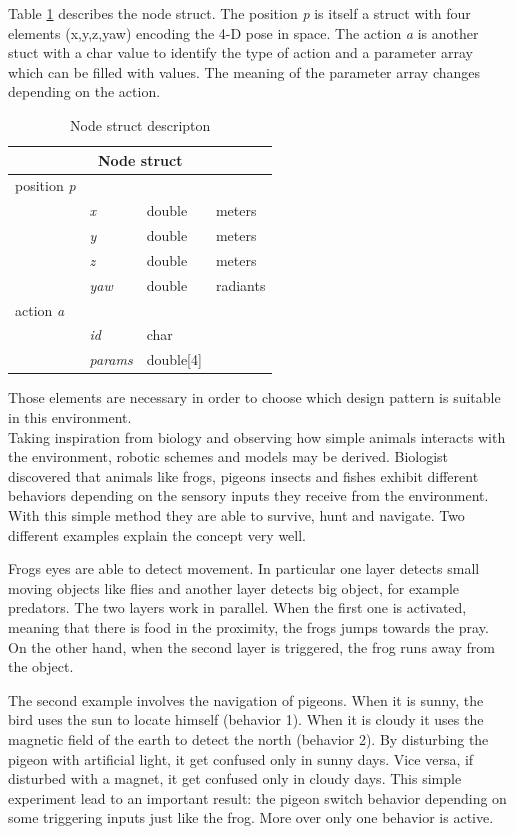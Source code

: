 Table \ref{tab:node} describes the node struct. The position \textit{p} is itself a struct with four elements (x,y,z,yaw) encoding the 4-D pose in space. The action \textit{a} is another stuct with a char value to identify the type of action and a parameter array which can be filled with values. The meaning of the parameter array changes depending on the action.
\begin{table}[h]
\centering
\begin{tabular}{llll}
\multicolumn{4}{c}{\textbf{Node} struct} \\
\hline
position \textit{p} &     &       &           \\
           & \textit{x}   & double & meters    \\
           & \textit{y}   & double & meters    \\
           & \textit{z}   & double & meters    \\
           & \textit{yaw} & double & radiants  \\ \hline
action \textit{a}   &     &       &           \\
           & \textit{id}  & char  &           \\
           & \textit{params}    &  double[4]     & \\
\end{tabular}
\label{tab:node}
\caption{Node struct descripton}
\end{table}
Those elements are necessary in order to choose which design pattern is suitable in this environment.
\newline \\
\noindent
Taking inspiration from biology and observing how simple animals interacts with the environment, robotic schemes and models may be derived. Biologist discovered that animals like frogs, pigeons insects and fishes exhibit different behaviors depending on the sensory inputs they receive from the environment. With this simple method they are able to survive, hunt and navigate. Two different examples explain the concept very well.

Frogs eyes are able to detect movement. In particular one layer detects small moving objects like flies and another layer detects big object, for example predators. The two layers work in parallel. When the first one is activated, meaning that there is food in the proximity, the frogs jumps towards the pray. On the other hand, when the second layer is triggered, the frog runs away from the object. 

The second example involves the navigation of pigeons. When it is sunny, the bird uses the sun to locate himself (behavior 1). When it is cloudy it uses the magnetic field of the earth to detect the north (behavior 2). By disturbing the pigeon with artificial light, it get confused only in sunny days. Vice versa, if disturbed with a magnet, it get confused only in cloudy days. This simple experiment lead to an important result: the pigeon switch behavior depending on some triggering inputs just like the frog. More over only one behavior is active. 
